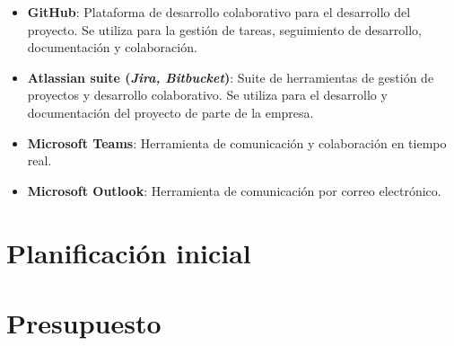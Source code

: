 \begin{itemize}
	\item \textbf{GitHub}: Plataforma de desarrollo colaborativo para el desarrollo del proyecto.
		Se utiliza para la gestión de tareas, seguimiento de desarrollo, documentación y
		colaboración.
	\item \textbf{Atlassian suite (\emph{Jira, Bitbucket})}: Suite de herramientas de gestión de proyectos
		y desarrollo colaborativo. Se utiliza para el desarrollo y documentación del proyecto de
		parte de la empresa.
	\item \textbf{Microsoft Teams}: Herramienta de comunicación y colaboración en tiempo real.
	\item \textbf{Microsoft Outlook}: Herramienta de comunicación por correo electrónico.
\end{itemize}

\newpage{}
\section{Planificación inicial}\label{sec:planif_inicial}

\newpage{}
\section{Presupuesto}\label{sec:presupuesto}
